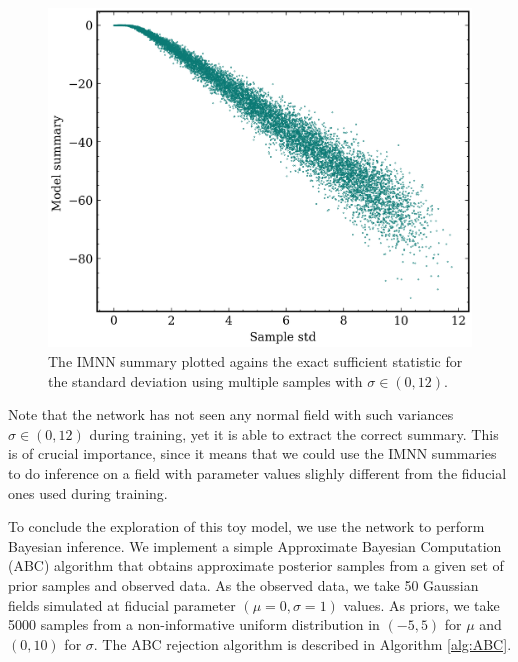 \begin{figure}
    \centering
    \includegraphics[width=0.75\linewidth]{img/ML/std_vs_model.png}
    \caption{The IMNN summary plotted agains the exact sufficient statistic for the standard deviation using multiple samples with $\sigma \in (0,12)$.}
    \label{fig:IMNN normal std}
\end{figure}
Note that the network has not seen any normal field with such variances $\sigma \in (0,12)$ during training, yet it is able to extract the correct summary. This is of crucial importance, since it means that we could use the IMNN summaries to do inference on a field with parameter values slighly different from the fiducial ones used during training.


To conclude the exploration of this toy model, we use the network to perform Bayesian inference. We implement a simple Approximate Bayesian Computation (ABC) \cite{review_ABC} algorithm that obtains approximate posterior samples from a given set of prior samples and observed data. As the observed data, we take 50 Gaussian fields simulated at fiducial parameter $(\mu=0, \sigma=1)$ values. As priors, we take 5000 samples from a non-informative uniform distribution in $(-5, 5)$ for $\mu$ and $(0, 10)$ for $\sigma$. The ABC rejection algorithm is described in Algorithm \ref{alg:ABC}.


